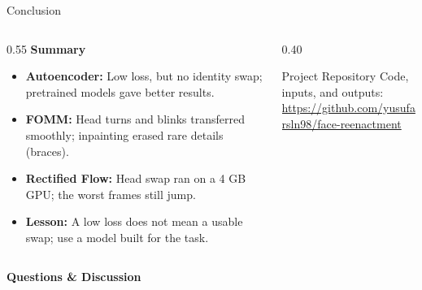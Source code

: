 \begin{frame}{Conclusion}
    \begin{columns}[T]
        \begin{column}{0.55\textwidth}
            \small
            \textbf{Summary}
            \begin{itemize}
                \item \textbf{Autoencoder:} Low loss, but no identity swap; pretrained models gave better results.
                \item \textbf{FOMM:} Head turns and blinks transferred smoothly; inpainting erased rare details (braces).
                \item \textbf{Rectified Flow:} Head swap ran on a 4 GB GPU; the worst frames still jump.
                \item \textbf{Lesson:} A low loss does not mean a usable swap; use a model built for the task.
            \end{itemize}
        \end{column}

        \begin{column}{0.40\textwidth}
            \begin{block}{Project Repository}
                \centering
                \scriptsize
                Code, inputs, and outputs:\\
                \vspace{0.15cm}
                \tiny \url{https://github.com/yusufarsln98/face-reenactment}
            \end{block}
        \end{column}
    \end{columns}

    \vspace{0.25cm}
    \begin{center}
        \large \textbf{Questions \& Discussion}
    \end{center}
\end{frame}

